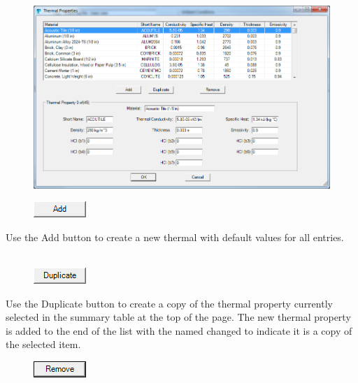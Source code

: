 \begin{figure}[h!]
\begin{center}
\includegraphics[width=6.5in]{FIGURES/Input_File/Edit_Thermal_Properties}
\end{center}
\end{figure}

\begin{figure}
  \includegraphics[width=0.781in]{FIGURES/Input_File/Add_Button}
\end{figure}

Use the Add button to create a new thermal with default values for all entries. \\~ \\

\begin{figure}
  \includegraphics[width=0.781in]{FIGURES/Input_File/Duplicate_Button}
\end{figure}

Use the Duplicate button to create a copy of the thermal property currently selected in the summary table at the top of the page. The new thermal property is added to the end of the list with the named changed to indicate it is a copy of the selected item. \\

\begin{figure}
  \includegraphics[width=0.781in]{FIGURES/Input_File/Remove_Button}
\end{figure}

